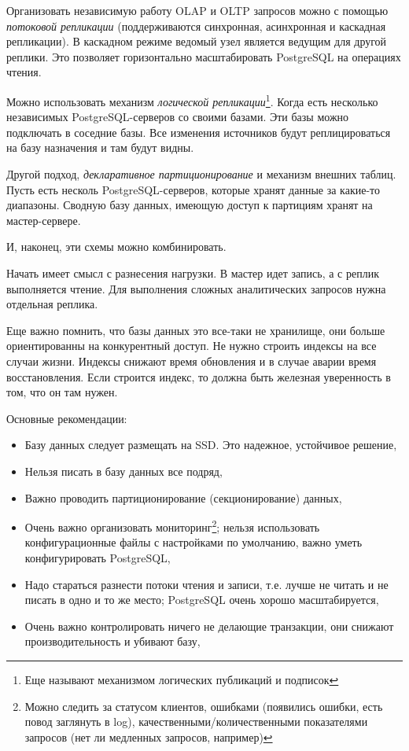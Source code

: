 \documentclass[%
	11pt,
	a4paper,
	utf8,
		]{article}
\begin{document}
Организовать независимую работу OLAP и OLTP запросов можно с помощью \emph{потоковой репликации} (поддерживаются синхронная, асинхронная и каскадная репликации). В каскадном режиме ведомый узел является ведущим для другой реплики. Это позволяет горизонтально масштабировать PostgreSQL на операциях чтения.

Можно использовать механизм \emph{логической репликации}\footnote{Еще называют механизмом логических публикаций и подписок}. Когда есть несколько независимых PostgreSQL-серверов со своими базами. Эти базы можно подключать в соседние базы. Все изменения источников будут реплицироваться на базу назначения и там будут видны.

Другой подход, \emph{декларативное партиционирование} и механизм внешних таблиц. Пусть есть несколь PostgreSQL-серверов, которые хранят данные за какие-то диапазоны. Сводную базу данных, имеющую доступ к партициям хранят на мастер-сервере.

И, наконец, эти схемы можно комбинировать.

Начать имеет смысл с разнесения нагрузки. В мастер идет запись, а с реплик выполняется чтение. Для выполнения сложных аналитических запросов нужна отдельная реплика.

Еще важно помнить, что базы данных это все-таки не хранилище, они больше ориентированны на конкурентный доступ. Не нужно строить индексы на все случаи жизни. Индексы снижают время обновления и в случае аварии время восстановления. Если строится индекс, то должна быть железная уверенность в том, что он там нужен.


Основные рекомендации:
\begin{itemize}	
	\item Базу данных следует размещать на SSD. Это надежное, устойчивое решение,
	
	\item Нельзя писать в базу данных все подряд,
	
	\item Важно проводить партиционирование (секционирование) данных,
	
	\item Очень важно организовать мониторинг\footnote{Можно следить за статусом клиентов, ошибками (появились ошибки, есть повод заглянуть в log), качественными/количественными показателями запросов (нет ли медленных запросов, например)}; нельзя использовать конфигурационные файлы с настройками по умолчанию, важно уметь конфигурировать PostgreSQL,
	
	\item Надо стараться разнести потоки чтения и записи, т.е. лучше не читать и не писать в одно и то же место; PostgreSQL очень хорошо масштабируется,
	
	\item Очень важно контролировать ничего не делающие транзакции, они снижают производительность и убивают базу,
\end{itemize}
\end{document}

